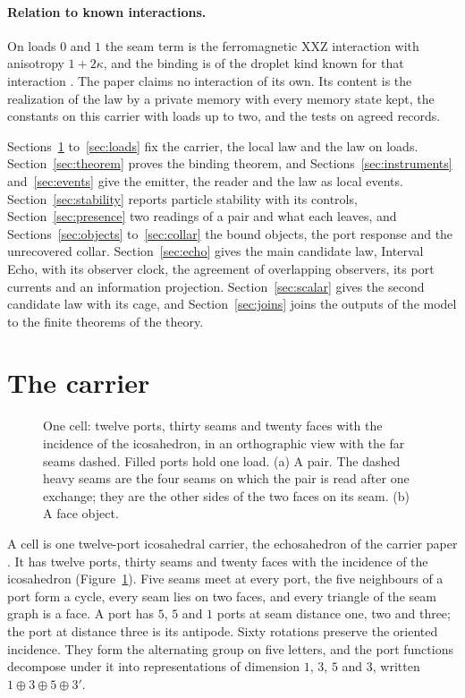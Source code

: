 \documentclass[11pt]{article}
\theoremstyle{definition}
\theoremstyle{remark}
\theoremstyle{plain}
\begin{document}
\paragraph{Relation to known interactions.}
On loads $0$ and $1$ the seam term is the ferromagnetic XXZ interaction
with anisotropy $1+2\kappa$, and the binding is of the droplet kind known
for that interaction \cite{nachtergaele2001,fischbacher2018}. The paper
claims no interaction of its own. Its content is the realization of the law
by a private memory with every memory state kept, the constants on this
carrier with loads up to two, and the tests on agreed records.

Sections~\ref{sec:carrier} to~\ref{sec:loads} fix the carrier, the local
law and the law on loads. Section~\ref{sec:theorem} proves the binding
theorem, and Sections~\ref{sec:instruments} and~\ref{sec:events} give the
emitter, the reader and the law as local events.
Section~\ref{sec:stability} reports particle stability with its controls,
Section~\ref{sec:presence} two readings of a pair and what each leaves, and
Sections~\ref{sec:objects} to~\ref{sec:collar} the bound objects, the port
response and the unrecovered collar. Section~\ref{sec:echo} gives the main
candidate law, Interval Echo, with its observer clock, the agreement of
overlapping observers, its port currents and an information projection.
Section~\ref{sec:scalar} gives the second candidate law with its cage, and
Section~\ref{sec:joins} joins the outputs of the model to the finite
theorems of the theory.


\section{The carrier}
\label{sec:carrier}

\begin{figure}[!htb]
\centering

\caption{One cell: twelve ports, thirty seams and twenty faces with the
incidence of the icosahedron, in an orthographic view with the far seams
dashed. Filled ports hold one load. (a) A pair. The dashed heavy seams are
the four seams on which the pair is read after one exchange; they are the
other sides of the two faces on its seam. (b) A face object.}
\label{fig:cell}
\end{figure}

A cell is one twelve-port icosahedral carrier, the echosahedron of the
carrier paper \cite{ophmicro}. It has twelve ports, thirty seams and twenty
faces with the incidence of the icosahedron (Figure~\ref{fig:cell}). Five
seams meet at every port, the five neighbours of a port form a cycle, every
seam lies on two faces, and every triangle of the seam graph is a face. A
port has $5$, $5$ and $1$ ports at seam distance one, two and three; the
port at distance three is its antipode. Sixty rotations preserve the
oriented incidence. They form the alternating group on five letters, and
the port functions decompose under it into representations of dimension
$1$, $3$, $5$ and $3$, written $1\oplus3\oplus5\oplus3'$.
\end{document}
